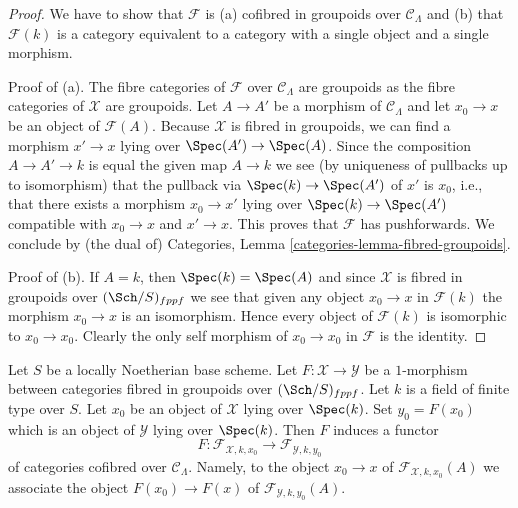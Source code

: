 \begin{proof}
We have to show that $\mathcal{F}$ is (a) cofibred in groupoids over
$\mathcal{C}_\Lambda$ and (b) that $\mathcal{F}(k)$ is a category equivalent
to a category with a single object and a single morphism.

\medskip\noindent
Proof of (a). The fibre categories of $\mathcal{F}$
over $\mathcal{C}_\Lambda$ are groupoids as the fibre categories
of $\mathcal{X}$ are groupoids. Let $A \to A'$ be a morphism of
$\mathcal{C}_\Lambda$ and let $x_0 \to x$ be an object of $\mathcal{F}(A)$.
Because $\mathcal{X}$ is fibred in groupoids, we can find a morphism
$x' \to x$ lying over $\Spec(A') \to \Spec(A)$. Since the composition
$A \to A' \to k$ is equal the given map $A \to k$ we see (by uniqueness
of pullbacks up to isomorphism) that the pullback via $\Spec(k) \to \Spec(A')$
of $x'$ is $x_0$, i.e., that there exists a morphism $x_0 \to x'$
lying over $\Spec(k) \to \Spec(A')$ compatible with
$x_0 \to x$ and $x' \to x$. This proves that $\mathcal{F}$ has
pushforwards. We conclude by (the dual of)
Categories, Lemma \ref{categories-lemma-fibred-groupoids}.

\medskip\noindent
Proof of (b). If $A = k$, then $\Spec(k) = \Spec(A)$ and since $\mathcal{X}$
is fibred in groupoids over $(\Sch/S)_{fppf}$ we see that given any object
$x_0 \to x$ in $\mathcal{F}(k)$ the morphism $x_0 \to x$ is an isomorphism.
Hence every object of $\mathcal{F}(k)$ is isomorphic to $x_0 \to x_0$.
Clearly the only self morphism of $x_0 \to x_0$ in $\mathcal{F}$ is
the identity.
\end{proof}

\noindent
Let $S$ be a locally Noetherian base scheme. Let
$F : \mathcal{X} \to \mathcal{Y}$ be a $1$-morphism between categories
fibred in groupoids over $(\Sch/S)_{fppf}$. Let $k$ is a field
of finite type over $S$. Let $x_0$ be an object of $\mathcal{X}$ lying
over $\Spec(k)$. Set $y_0 = F(x_0)$ which is an object of $\mathcal{Y}$
lying over $\Spec(k)$. Then $F$ induces a functor
\begin{equation}
\label{equation-functoriality}
F :
\mathcal{F}_{\mathcal{X}, k, x_0}
\longrightarrow
\mathcal{F}_{\mathcal{Y}, k, y_0}
\end{equation}
of categories cofibred over $\mathcal{C}_\Lambda$. Namely, to the object
$x_0 \to x$ of $\mathcal{F}_{\mathcal{X}, k, x_0}(A)$ we associate
the object $F(x_0) \to F(x)$ of $\mathcal{F}_{\mathcal{Y}, k, y_0}(A)$.

